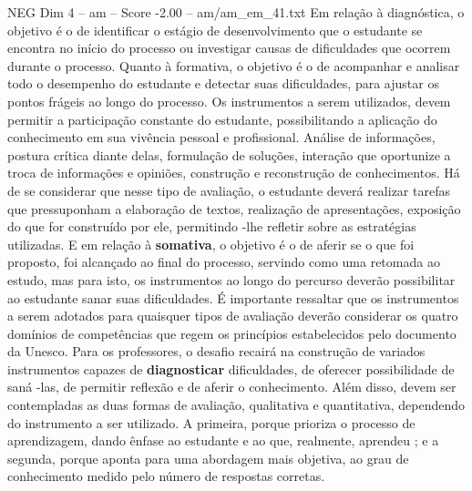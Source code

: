 \begin{textsample}{NEG Dim 4 – am – Score -2.00 – am/am\_em\_41.txt}
Em relação à diagnóstica, o objetivo é o de identificar o estágio de desenvolvimento que o estudante se encontra no início do processo ou investigar causas de dificuldades que ocorrem durante o processo.
Quanto à formativa, o objetivo é o de acompanhar e analisar todo o desempenho do estudante e detectar suas dificuldades, para ajustar os pontos frágeis ao longo do processo.
Os instrumentos a serem utilizados, devem permitir a participação constante do estudante, possibilitando a aplicação do conhecimento em sua vivência pessoal e profissional.
Análise de informações, postura crítica diante delas, formulação de soluções, interação que oportunize a troca de informações e opiniões, construção e reconstrução de conhecimentos.
Há de se considerar que nesse tipo de avaliação, o estudante deverá realizar tarefas que pressuponham a elaboração de textos, realização de apresentações, exposição do que for construído por ele, permitindo -lhe refletir sobre as estratégias utilizadas.
E em relação à \textbf{somativa}, o objetivo é o de aferir se o que foi proposto, foi alcançado ao final do processo, servindo como uma retomada ao estudo, mas para isto, os instrumentos ao longo do percurso deverão possibilitar ao estudante sanar suas dificuldades.
É importante ressaltar que os instrumentos a serem adotados para quaisquer tipos de avaliação deverão considerar os quatro domínios de competências que regem os princípios estabelecidos pelo documento da Unesco.
Para os professores, o desafio recairá na construção de variados instrumentos capazes de \textbf{diagnosticar} dificuldades, de oferecer possibilidade de saná -las, de permitir reflexão e de aferir o conhecimento.
Além disso, devem ser contempladas as duas formas de avaliação, qualitativa e quantitativa, dependendo do instrumento a ser utilizado.
A primeira, porque prioriza o processo de aprendizagem, dando ênfase ao estudante e ao que, realmente, aprendeu ; e a segunda, porque aponta para uma abordagem mais objetiva, ao grau de conhecimento medido pelo número de respostas corretas.

\end{textsample}
